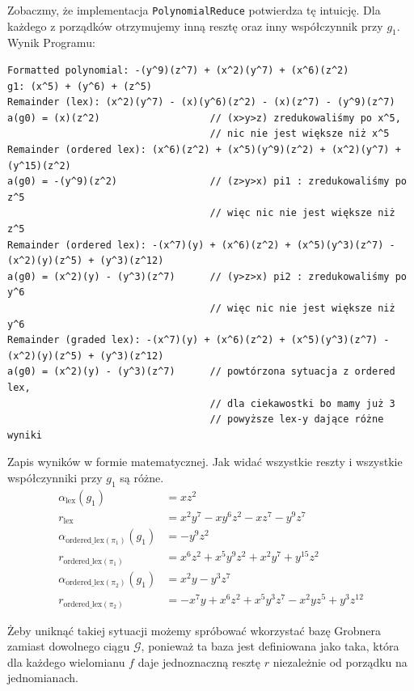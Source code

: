 \documentclass[10pt, a4paper]{article}
\begin{document}
\noindent
Zobaczmy, że implementacja \texttt{PolynomialReduce} potwierdza tę intuicję. Dla każdego z porządków otrzymujemy inną resztę oraz inny współczynnik przy $g_1$.\\

\noindent
Wynik Programu:

\begin{verbatim}
Formatted polynomial: -(y^9)(z^7) + (x^2)(y^7) + (x^6)(z^2)
g1: (x^5) + (y^6) + (z^5)
Remainder (lex): (x^2)(y^7) - (x)(y^6)(z^2) - (x)(z^7) - (y^9)(z^7)
a(g0) = (x)(z^2)                   // (x>y>z) zredukowaliśmy po x^5,
                                   // nic nie jest większe niż x^5
Remainder (ordered lex): (x^6)(z^2) + (x^5)(y^9)(z^2) + (x^2)(y^7) + (y^15)(z^2)
a(g0) = -(y^9)(z^2)                // (z>y>x) pi1 : zredukowaliśmy po z^5
                                   // więc nic nie jest większe niż z^5
Remainder (ordered lex): -(x^7)(y) + (x^6)(z^2) + (x^5)(y^3)(z^7) - (x^2)(y)(z^5) + (y^3)(z^12)
a(g0) = (x^2)(y) - (y^3)(z^7)      // (y>z>x) pi2 : zredukowaliśmy po y^6 
                                   // więc nic nie jest większe niż y^6
Remainder (graded lex): -(x^7)(y) + (x^6)(z^2) + (x^5)(y^3)(z^7) - (x^2)(y)(z^5) + (y^3)(z^12)
a(g0) = (x^2)(y) - (y^3)(z^7)      // powtórzona sytuacja z ordered lex, 
                                   // dla ciekawostki bo mamy już 3 
                                   // powyższe lex-y dające różne wyniki
\end{verbatim}

\noindent
\normalsize
Zapis wyników w formie matematycznej. Jak widać wszystkie reszty i wszystkie współczynniki przy $g_1$ są różne.
\begin{align*}
    \alpha_{\text{lex}}(g_1) &= x z^2 \\
    r_{\text{lex}} &= x^2 y^7 - x y^6 z^2 - x z^7 - y^9 z^7 \\
    \alpha_{\text{ordered\_lex}(\pi_1)}(g_1) &= -y^9 z^2 \\
    r_{\text{ordered\_lex}(\pi_1)} &= x^6 z^2 + x^5 y^9 z^2 + x^2 y^7 + y^{15} z^2 \\
    \alpha_{\text{ordered\_lex}(\pi_2)}(g_1) &= x^2 y - y^3 z^7 \\
    r_{\text{ordered\_lex}(\pi_2)} &= -x^7 y + x^6 z^2 + x^5 y^3 z^7 - x^2 y z^5 + y^3 z^{12}
\end{align*}

\noindent
Żeby uniknąć takiej sytuacji możemy spróbować wkorzystać bazę Grobnera zamiast dowolnego ciągu $\mathcal{G}$,
ponieważ ta baza jest definiowana jako taka, która dla każdego wielomianu $f$ daje jednoznaczną resztę $r$ niezależnie od porządku na jednomianach.
\end{document}
